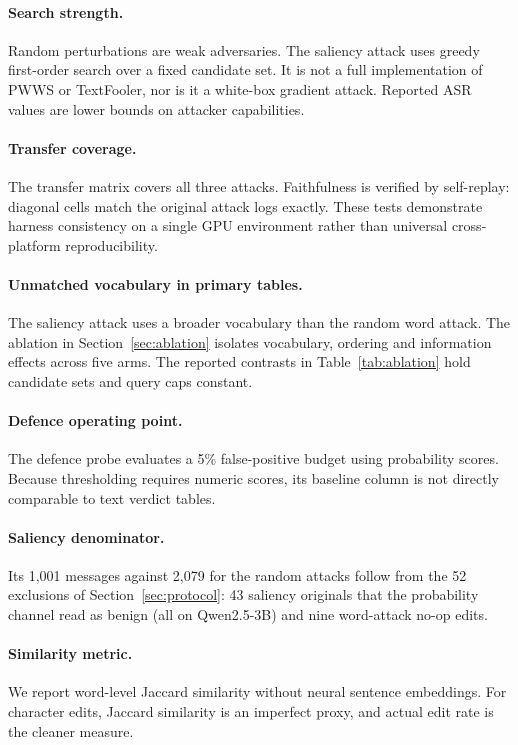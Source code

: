 \paragraph{Search strength.} Random perturbations are weak adversaries. The
saliency attack uses greedy first-order search over a fixed candidate set. It
is not a full implementation of PWWS or TextFooler, nor is it a white-box
gradient attack. Reported ASR values are lower bounds on attacker capabilities.

\paragraph{Transfer coverage.} The transfer matrix covers all three attacks.
Faithfulness is verified by self-replay: diagonal cells match the original
attack logs exactly. These tests demonstrate harness consistency on a single GPU
environment rather than universal cross-platform reproducibility.

\paragraph{Unmatched vocabulary in primary tables.} The saliency attack uses a
broader vocabulary than the random word attack. The ablation in
Section~\ref{sec:ablation} isolates vocabulary, ordering and information effects across
five arms. The reported contrasts in Table~\ref{tab:ablation} hold candidate
sets and query caps constant.

\paragraph{Defence operating point.} The defence probe evaluates a 5\%
false-positive budget using probability scores. Because thresholding requires
numeric scores, its baseline column is not directly comparable to text verdict
tables.

\paragraph{Saliency denominator.} Its 1{,}001 messages against 2{,}079 for the
random attacks follow from the 52 exclusions of Section~\ref{sec:protocol}: 43 saliency
originals that the probability channel read as benign (all on Qwen2.5-3B) and
nine word-attack no-op edits.

\paragraph{Similarity metric.} We report word-level Jaccard similarity without
neural sentence embeddings. For character edits, Jaccard similarity is an
imperfect proxy, and actual edit rate is the cleaner measure.

